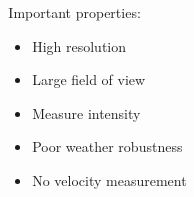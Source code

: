 \begin{frame}
\begin{columns}[T]
\begin{column}{.5\textwidth}
\begin{columns}[T]
\begin{column}{0.4\textwidth}
\begin{itemize}
                \end{itemize}
            \end{column}
            \begin{column}{0.6\textwidth}
                \footnotesize
                Important properties:
                \begin{itemize}
                    \item High resolution
                    \item Large field of view
                    \item Measure intensity
                    \item Poor weather robustness
                    \item No velocity measurement
                \end{itemize}
            \end{column}
        \end{columns}
    \end{column}
\end{columns}
\end{frame}

